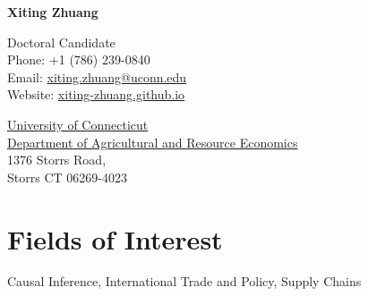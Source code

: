 \documentclass[10.5 pt,letterpaper]{article}
\def\name{Xiting Zhuang}
\begin{document}
	
	{\huge \textbf{\name}}
	
	
	\vspace{0.25in}
	
	\begin{minipage}[t]{0.45\textwidth}
		Doctoral Candidate \\
		Phone: +1 (786) 239-0840 \\
		Email: \href{mailto:xiting.zhuang@uconn.edu}{xiting.zhuang@uconn.edu} \\
		Website: \href{https://xiting-zhuang.github.io}{xiting-zhuang.github.io} \\
		
	\end{minipage}
	\begin{minipage}[t]{0.6\textwidth}
		\href{https://uconn.edu/}{University of Connecticut} \\
		\href{https://are.uconn.edu/}{Department of Agricultural and Resource Economics} \\
		1376 Storrs Road,  	\\
		Storrs CT 06269-4023 
	\end{minipage}
	
	
		\section*{\textbf{Fields of Interest}}
	
	Causal Inference, International Trade and Policy,  Supply Chains 
	
	
\end{document}
